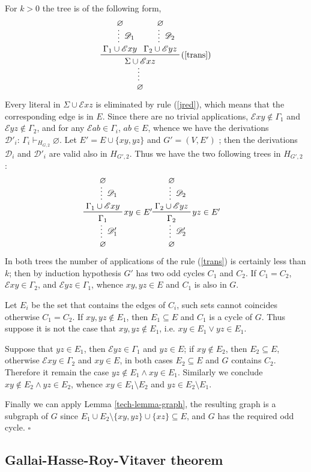 \documentclass[a4paper,12pt,oneside]{book}
\newcommand{\E}{\mathscr{E}}
\newcommand{\D}{\mathscr{D}}
\newcommand*{\QED}{\hfill\ensuremath{\square}}
\let\emptyset\varnothing
\let\o\vee
\let\e\wedge
\begin{document}
For $k >0$ the tree is of the following form, 
$$
\prftree[r]{(\ref{trans})}
{\prfsummary[$\D_1$]{\emptyset}{\Gamma_1 \cup \E xy }}
{\prfsummary[$\D_2$]{\emptyset}{\Gamma_2 \cup \E yz }}
{\prfsummary{\Sigma \cup \E xz }{\emptyset}}
$$
Every literal in $\Sigma\cup\E xz$ is eliminated by rule (\ref{jred}), which means that the corresponding edge is in $E$. Since there are no trivial applications, $\E xy \notin \Gamma_1 $ and $\E yz \notin \Gamma_2 $, and for any $\E ab \in \Gamma_i$, $ab \in E$, whence we have the derivations $\D'_i:\,\Gamma_i \vdash_{H_{G,2}} \emptyset$. 
\newpage
Let $E'=E\cup\{xy,yz\}$ and $G'=(V,E' )$ ; then the derivations $\D_i$ and $\D'_i$ are valid also in $H_{G',2}$. Thus we have the two following trees in  $H_{G',2}$ :
\begin{eqnarray*}
\prfsummary[$\D'_1$]{
\prftree[r]{$xy \in E'$}{\prfsummary[$\D_1$]{\emptyset}{\Gamma_1 \cup \E xy}}{\Gamma_1}}
{\emptyset}
&\prfsummary[$\D'_2$]{
\prftree[r]{$yz \in E'$}{\prfsummary[$\D_2$]{\emptyset}{\Gamma_2 \cup\E yz}}{\Gamma_2}}
{\emptyset}
\end{eqnarray*}
In both trees the number of applications of the rule (\ref{trans}) is certainly less than $k$; then by induction hypothesis $G'$ has two odd cycles $C_1$ and $C_2$. If $C_1=C_2$, $\E xy \in \Gamma_2$, and $\E yz \in \Gamma_1$, whence $xy,yz\in E$ and $C_1$ is also in $G$.

Let $E_i$ be the set that contains the edges of $C_i$, such sets cannot coincides otherwise $C_1=C_2$.
If $xy,yz \notin E_1$, then $E_1\subseteq E$ and $C_1$ is a cycle of $G$. 
Thus suppose it is not the case that $xy,yz \notin E_1$, i.e. $xy \in E_1 \o yz\in E_1 $. 

Suppose that $yz\in E_1$, then $\E yz\in\Gamma_1$ and $yz\in E$; if $xy\notin E_2$, then $E_2\subseteq E$, otherwise $\E xy \in \Gamma_2$ and $xy\in E$, in both cases  $E_2\subseteq E$ and $G$ contains $C_2$.
 Therefore it remain the case $yz\notin E_1 \e xy\in E_1$. Similarly we conclude  $xy\notin E_2 \e yz\in E_2$, whence $xy\in E_1\setminus E_2$ and $yz\in E_2\setminus E_1$.

Finally we can apply Lemma  \ref{tech-lemma-graph}, the resulting graph is a subgraph of $G$ since $E_1\cup E_2\setminus\{xy,yz\}\cup\{xz\} \subseteq E $, and $G$ has the required odd cycle. 
\QED

 
\newpage\subsection*{Gallai-Hasse-Roy-Vitaver theorem}
\end{document}
